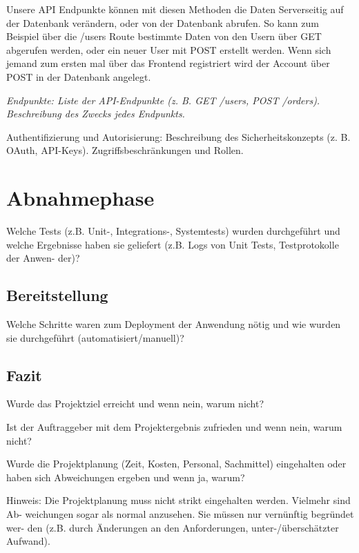 \documentclass[a4paper,12pt]{article}
\begin{document}
Unsere API Endpunkte können mit diesen Methoden die Daten Serverseitig auf der Datenbank verändern, oder von der Datenbank abrufen. So kann zum Beispiel über die /users Route bestimmte Daten von den Usern über GET abgerufen werden, oder ein neuer User mit POST erstellt werden. Wenn sich jemand zum ersten mal über das Frontend registriert wird der Account über POST in der Datenbank angelegt. 

\textit{Endpunkte: Liste der API-Endpunkte (z. B. GET /users, POST /orders).
Beschreibung des Zwecks jedes Endpunkts.}

Authentifizierung und Autorisierung: Beschreibung des Sicherheitskonzepts (z. B.
OAuth, API-Keys).  Zugriffsbeschränkungen und Rollen.

\newpage \section{Abnahmephase}
Welche Tests (z.B. Unit-, Integrations-,
Systemtests) wurden durchgeführt und welche Ergebnisse haben sie geliefert
(z.B. Logs von Unit Tests, Testprotokolle der Anwen- der)?

\subsection{Bereitstellung}
Welche Schritte waren zum Deployment der Anwendung
nötig und wie wurden sie durchgeführt (automatisiert/manuell)?

\subsection{Fazit}
Wurde das Projektziel erreicht und wenn nein, warum nicht?

Ist der Auftraggeber mit dem Projektergebnis zufrieden und wenn nein, warum
nicht?

Wurde die Projektplanung (Zeit, Kosten, Personal, Sachmittel) eingehalten oder
haben sich Abweichungen ergeben und wenn ja, warum?

Hinweis: Die Projektplanung muss nicht strikt eingehalten werden. Vielmehr sind
Ab- weichungen sogar als normal anzusehen. Sie müssen nur vernünftig begründet
wer- den (z.B. durch Änderungen an den Anforderungen, unter-/überschätzter
Aufwand).

\newpage
\printbibliography
\end{document}
